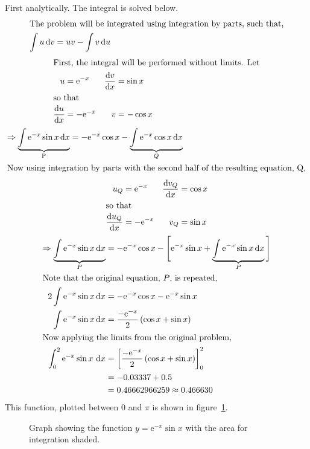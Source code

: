 \documentclass[11pt]{article} %
\newcommand{\inputTikZ}[1]{%
  }
\newcommand{\inputTikZ}[1]{%
    \beginpgfgraphicnamed{#1-external}%
    \endpgfgraphicnamed%
  }
\renewcommand{\d}{\,\mathrm{d}} %
\newcommand{\dx}[2]{\frac{\textrm{d} #1}{\textrm{d} #2}} %
\newcommand{\e}[1]{\text{e}^{#1}} %
\newcommand{\inter}[1]{\shortintertext{#1}}
\begin{document}
	First analytically. The integral is solved below.
	\begin{align*}
		\inter{The problem will be integrated using integration by parts, such that,}
		\int u \d v &= uv - \int v \d u \\
	\end{align*}
	\vspace{-1.5cm}
	\begin{align*}
		\inter{First, the integral will be performed without limits. Let}
		u &= \e{-x} & \dx{v}{x} &= \sin x\\
		\inter{so that}
		\dx{u}{x} &= -\e{-x} & v &= -\cos x\\
	\end{align*}
	\vspace{-1cm}
	\begin{align*}
		\Rightarrow \underbrace{\int \e{-x} \sin x\d x }_\text{P} &= -\e{-x}\cos x - \underbrace{\int \e{-x} \cos x \d x}_{Q} \\
		\inter{Now using integration by parts with the second half of the resulting equation, Q,}
	\end{align*}
	\vspace{-1.5cm}
	\begin{align*}
		u_Q &= \e{-x} & \dx{v_Q}{x} &= \cos x\\
		\inter{so that}
		\dx{u_Q}{x} &= -\e{-x} & v_Q &= \sin x\\
	\end{align*}
	\vspace{-1cm}
	\begin{align*}
		\Rightarrow \underbrace{\int \e{-x} \sin x \d x}_{P} &= -\e{-x} \cos x - \Bigg[ \e{-x} \sin x + \underbrace{\int \e{-x}\sin x \d x}_{P} \Bigg]\\
		\inter{Note that the original equation, $P$, is repeated,}
		2\int \e{-x} \sin x \d x &= -\e{-x} \cos x - \e{-x} \sin x \\
		\int \e{-x} \sin x \d x &= \frac{-\e{-x}}{2}\left(\cos x + \sin x\right) \\
		\inter{Now applying the limits from the original problem,}
		\int_0^2 \e{-x}\sin x\,\d x &= \left[ \frac{-\e{-x}}{2}\left(\cos x + \sin x\right)\right]_0^2\\
		 &= -0.03337 + 0.5\\
		 &= 0.46662966259 \approx 0.466630
	\end{align*}
	This function, plotted between $0$ and $\pi$ is shown in figure~\ref{fig:graph1}.
	\begin{figure}[h]
			\centering
				\inputTikZ{Graph1}
			\caption{\label{fig:graph1}Graph showing the function $y = \e{-x}\sin x$ with the area for integration shaded.}
	\end{figure}
\end{document}
